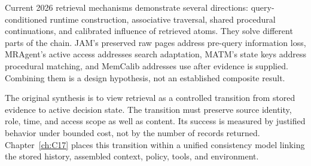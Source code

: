 Current 2026 retrieval mechanisms demonstrate several directions: query-conditioned runtime construction, associative traversal, shared procedural continuations, and calibrated influence of retrieved atoms. They solve different parts of the chain. JAM's preserved raw pages address pre-query information loss, MRAgent's active access addresses search adaptation, MATM's state keys address procedural matching, and MemCalib addresses use after evidence is supplied. Combining them is a design hypothesis, not an established composite result.

The original synthesis is to view retrieval as a controlled transition from stored evidence to active decision state. The transition must preserve source identity, role, time, and access scope as well as content. Its success is measured by justified behavior under bounded cost, not by the number of records returned. Chapter~\ref{ch:C17} places this transition within a unified consistency model linking the stored history, assembled context, policy, tools, and environment.
